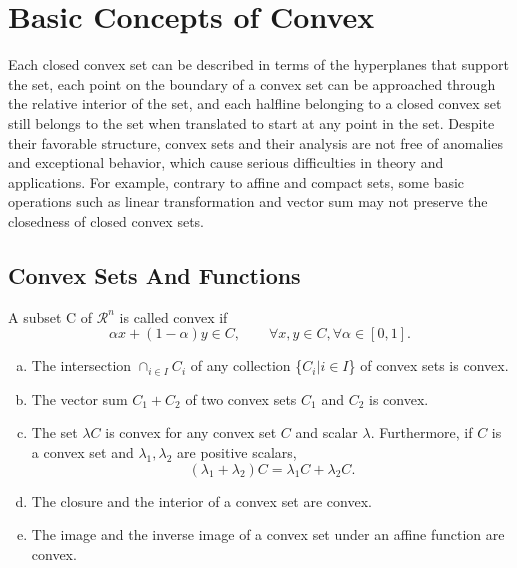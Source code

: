 \chapter{Basic Concepts of Convex}
\label{chapter:basic}
 Each closed convex set can be described in terms of the hyperplanes that support the set, each point on the boundary of a convex set can be approached through the relative interior of the set, and each halfline belonging to a closed convex set still belongs to the set when translated to start at any point in the set. Despite their favorable structure, convex sets and their analysis are not free of anomalies and exceptional behavior, which cause serious difficulties in theory and applications. For example, contrary to affine and compact sets, some basic operations such as linear transformation and vector sum may not preserve the closedness of closed convex sets.

\section{Convex Sets And Functions}
\label{sec:convexsetsandfunctions}
\begin{definition}
    \label{def:1.1.1}
    A subset C of $\mathcal{R}^n$ is called convex if 
    \begin{equation*}
        \alpha x+(1-\alpha)y \in C, \qquad \forall x, y \in C, \forall \alpha \in [0,1].
    \end{equation*}
\end{definition}

\begin{proposition}\textrm{}
    \begin{enumerate}[(a)]
        \item The intersection $\cap_{i \in I}C_i$ of any collection \{$C_i | i \in I$\} of convex sets is convex.
        \item The vector sum $C_1+C_2$ of two convex sets $C_1$ and $C_2$ is convex.
        \item The set $\lambda C$ is convex for any convex set $C$ and scalar $\lambda$. Furthermore, if $C$ is a convex set and $\lambda_1,\lambda_2$ are positive scalars,
            \begin{equation*}
                (\lambda_1+\lambda_2)C = \lambda_1C+\lambda_2C.
            \end{equation*}
        \item The closure and the interior of a convex set are convex.
        \item The image and the inverse image of a convex set under an affine function are convex.
    \end{enumerate}
\end{proposition}




